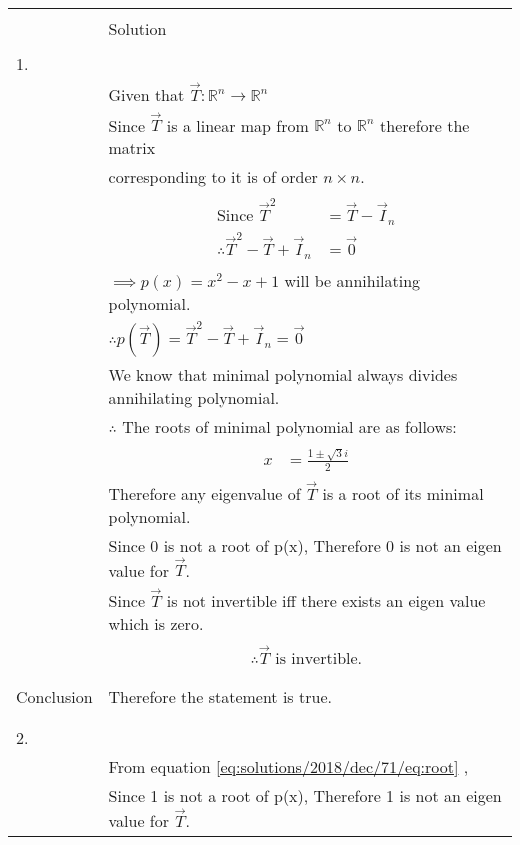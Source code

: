 \onecolumn
\begin{longtable}{|l|l|}
\hline
\multirow{3}{*}{} & \\
Statement&Solution\\
\hline
&\\
1.&\\
&Given that $\vec{T}:\mathbb{R}^n \rightarrow \mathbb{R}^n$\\
&Since $\vec{T}$ is a linear map from $\mathbb{R}^n$ to $\mathbb{R}^n$ therefore the matrix\\
&corresponding to it is of order $n \times n$.\\
&\parbox{6cm}{\begin{align*}
    \mbox{Since }\vec{T}^2&=\vec{T}-\vec{I}_{n}\\
    \therefore\vec{T}^2-\vec{T}+\vec{I}_{n}&=\vec{0}
\end{align*}}\\
&$\implies p(x)=x^2-x+1$ will be annihilating polynomial.\\
&$\therefore p(\vec{T})=\vec{T}^2-\vec{T}+\vec{I}_{n}=\vec{0}$\\
&We know that minimal polynomial always divides annihilating polynomial.\\
&$\therefore$ The roots of minimal polynomial are as follows:\\
&\parbox{6cm}{\begin{align}
    x&=\frac{1\pm\sqrt{3}i}{2}\label{eq:solutions/2018/dec/71/eq:root}
\end{align}}\\
&Therefore any eigenvalue of $\vec{T}$ is a root of its minimal polynomial.\\
&Since 0 is not a root of p(x), Therefore 0 is not an eigen value for $\vec{T}$.\\
&Since $\vec{T}$ is not invertible iff there exists an eigen value which is zero.\\
&\parbox{6cm}{\begin{align}
    \therefore\vec{T}\mbox{ is invertible.}
\end{align}}\\
&\\
\hline
&\\
Conclusion&Therefore the statement is true.\\
&\\
\hline
&\\
2.&\\
& From equation \eqref{eq:solutions/2018/dec/71/eq:root} ,\\
&Since 1 is not a root of p(x), Therefore 1 is not an eigen value for $\vec{T}$.\\

\end{longtable}
